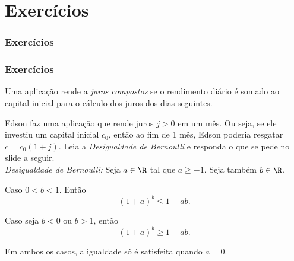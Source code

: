 \section{Exercícios}
\begin{frame}
\frametitle{Exercícios} 




\end{frame}



\begin{frame}
\frametitle{Exercícios} 



\begin{exercise}
    Uma aplicação rende a \emph{juros compostos} se o rendimento diário é somado ao capital inicial para o cálculo dos juros dos dias seguintes.
    
    Edson faz uma aplicação que rende juros $j>0$ em um mês. Ou seja, se ele investiu um capital inicial $c_0$, então ao fim de 1 mês, Edson poderia resgatar $c = c_0(1+j)$. Leia a \emph{Desigualdade de Bernoulli} e responda o que se pede no slide a seguir.\\
	
	\emph{Desigualdade de Bernoulli:}
        Seja $a \in \R$ tal que $a \geq -1$. Seja também $b \in \R$.
        
         Caso $0 < b < 1$. Então $$(1+a)^b \leq 1 + ab.$$
        
         Caso seja $b<0$ ou $b>1$, então $$(1+a)^b \geq 1 + ab.$$
        
         Em ambos os casos, a igualdade só é satisfeita quando $a=0$.
\end{exercise}

\end{frame}


